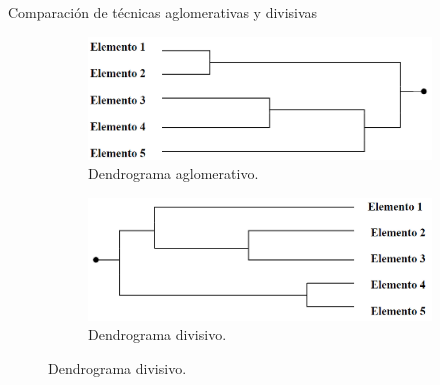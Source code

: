 \documentclass[spanish]{beamer}
\begin{document}
\begin{frame}{Comparación de técnicas aglomerativas y divisivas}

	\begin{figure}[H]
	\centering
	\begin{subfigure}[b]{.47\textwidth}
		  \centering
	  \includegraphics[width=\textwidth]{victoria/aglomerativo}
	  \caption{Dendrograma aglomerativo.}
	  \label{fig:aglomerativo}
	\end{subfigure}
	\begin{subfigure}[b]{.47\textwidth}
	  \centering
	  \includegraphics[width=\textwidth]{victoria/disociativo}
	  \caption{Dendrograma divisivo.}
	  \label{fig:divisivo}
	\end{subfigure}
	\label{fig:compDendro}
	\end{figure}

\end{frame}
\end{document}

